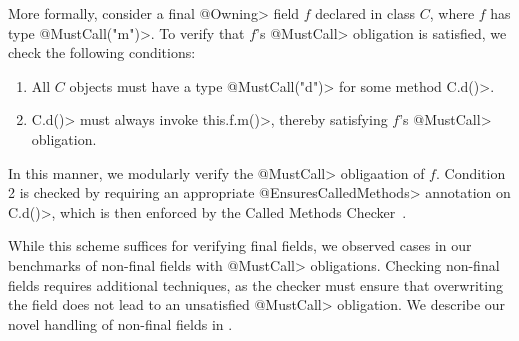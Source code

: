   More formally, consider a final \<@Owning> field $f$ declared in class $C$,
  where
  $f$ has type \<@MustCall("m")>.  To
  verify that $f$'s \<@MustCall> obligation is satisfied, we check the following
  conditions:
  \begin{enumerate}
    \item All $C$ objects must have a type \<@MustCall("d")> for some method \<C.d()>.
    \item \<C.d()> must always invoke \<this.f.m()>, thereby satisfying $f$'s
    \<@MustCall> obligation.
  \end{enumerate}
  In this manner, we modularly verify the \<@MustCall> obligaation of $f$.  Condition 2 is
  checked by requiring an appropriate \<@EnsuresCalledMethods> annotation on
  \<C.d()>, which is then enforced by the Called Methods
  Checker~\cite{KelloggRSSE2020}.   

  While this scheme suffices for verifying final fields, we observed cases
  in our benchmarks of non-final fields with \<@MustCall> obligations.  Checking
  non-final fields requires additional techniques, as the checker must ensure
  that overwriting the field does not lead to an unsatisfied \<@MustCall> obligation.  We
  describe our novel handling of non-final fields in .


